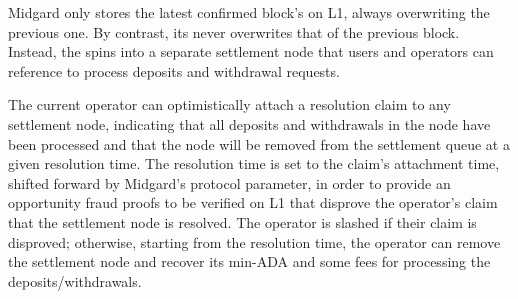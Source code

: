 \documentclass[../midgard.tex]{subfiles}
\begin{document}
Midgard only stores the latest confirmed block's  on L1, always overwriting the previous one.
By contrast, its  never overwrites that of the previous block.
Instead, the  spins into a separate settlement node that users and operators can reference to process deposits and withdrawal requests.

The current operator can optimistically attach a resolution claim to any settlement node, indicating that all deposits and withdrawals in the node have been processed and that the node will be removed from the settlement queue at a given resolution time.
The resolution time is set to the claim's attachment time, shifted forward by Midgard's  protocol parameter, in order to provide an opportunity fraud proofs to be verified on L1 that disprove the operator's claim that the settlement node is resolved.
The operator is slashed if their claim is disproved; otherwise, starting from the resolution time, the operator can remove the settlement node and recover its min-ADA and some fees for processing the deposits/withdrawals.
\end{document}
